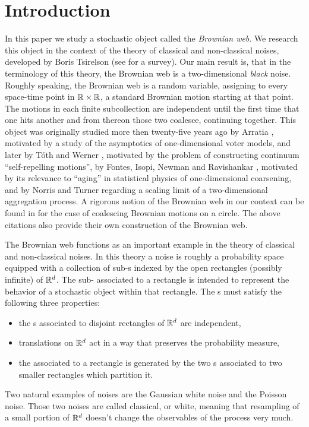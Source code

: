 {\section{Introduction}
In this paper we study a stochastic object called the \emph{Brownian web}. We
research this object in the context of the theory of classical and
non-classical noises, developed by Boris Tsirelson
(see \cite{tsirelson-nonclassical-stochastic-flows} for a survey).
Our main result
is, that in the terminology of this theory, the Brownian web is a
two-dimensional \emph{black} noise.
Roughly speaking, the Brownian web is a random variable, assigning to
every space-time point in $\mathbb{R}\times\mathbb{R}$, a standard Brownian motion starting
at that point.  The motions in each finite subcollection are independent
until the first time that one hits another
and from thereon those two coalesce, continuing together. This object was
originally studied more then twenty-five years ago by Arratia \cite{arratia}, motivated
by a study of the asymptotics of one-dimensional voter models, and later
by T\'{o}th and Werner \cite{toth-werner},
motivated by the problem of constructing continuum
``self-repelling motions'', by Fontes, Isopi, Newman and Ravishankar
\cite{fontes-et-al},
motivated by its relevance to ``aging'' in statistical physics of
one-dimensional coarsening, and by Norris and Turner
\cite{norris-turner}
regarding a scaling limit of a two-dimensional aggregation process.
A rigorous notion of the Brownian web in our context
can be found in \cite{tsirelson-lecture-course} for the case of coalescing
Brownian motions on a circle.  The above citations also provide
their own construction of the Brownian web.

The Brownian web functions as an important example in the theory of
classical and non-classical noises. In this
theory a noise is roughly a probability space equipped with a collection
of sub-\sigfield{}s indexed by the open rectangles (possibly infinite) of
$\mathbb{R}^d$.  The sub-\sigfield{} associated to a rectangle is intended to
represent the behavior of a stochastic object within that rectangle.
The \sigfield{}s must satisfy the following three properties:
\begin{itemize}
\item the \sigfield{}s associated to disjoint rectangles of $\mathbb{R}^d$ are
independent,
\item translations on $\mathbb{R}^d$ act in a way that preserves the
probability measure,
\item the \sigfield{}
associated to a rectangle is generated by the two \sigfield{}s
associated to two smaller rectangles which partition it.
\end{itemize}
Two natural examples of noises are the Gaussian white noise
and the Poisson noise. Those two noises are called classical, or white,
meaning that
resampling of a small portion of $\mathbb{R}^d$ doesn't change the observables of the
process very much.

}
